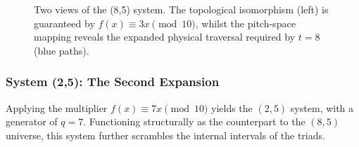 \documentclass[11pt,letterpaper]{amsart}
\begin{document}
\begin{figure}[H]
\begin{minipage}{0.48\textwidth}
        \caption*{Pitch-Space Layout \\ (Geometric Rewiring)}
    \end{minipage}
    \caption{Two views of the (8,5) system. The topological isomorphism (left) is guaranteed by $f(x) \equiv 3x \pmod{10}$, whilst the pitch-space mapping reveals the expanded physical traversal required by $t=8$ (blue paths).}
\end{figure}

\subsubsection{System (2,5): The Second Expansion}

Applying the multiplier $f(x) \equiv 7x \pmod{10}$ yields the $(2,5)$ system, with a generator of $q=7$. Functioning structurally as the counterpart to the $(8,5)$ universe, this system further scrambles the internal intervals of the triads. 
\end{document}
